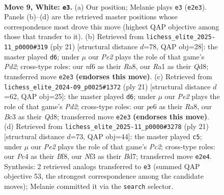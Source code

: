 \documentclass[11pt]{article}
\begin{document}
\clearpage

\begin{figure}[p]\centering
\begin{subfigure}{0.46\textwidth}\centering
\resizebox{\linewidth}{!}{%
\newchessgame
\chessboard[
  setfen={r1b1r1k1/ppppqppp/2n1pn2/8/2PP3P/2B2NP1/PP2PP2/R2QKB1R w KQ - 1 9},
  showmover=false,
  pgfstyle=straightmove, color=movearrow, markmove={e2-e3}
]}
\caption{}
\end{subfigure}\hfill
\begin{subfigure}{0.46\textwidth}\centering
\resizebox{\linewidth}{!}{%
\newchessgame
\chessboard[
  setfen={r1bq1rk1/2ppnpbp/p5p1/np6/3PP3/2N2N2/PPB2PPP/R1BQ1RK1 b - - 4 11},
  showmover=false,
  pgfstyle=straightmove, color=movearrow, markmove={d7-d6}
]}
\caption{}
\end{subfigure}
\\[4pt]
\begin{subfigure}{0.46\textwidth}\centering
\resizebox{\linewidth}{!}{%
\newchessgame
\chessboard[
  setfen={r1bq1rk1/pppp1pb1/2n3p1/4p2p/2P5/P1NPPN2/1P1QBPPP/R4RK1 b - - 7 11},
  showmover=false,
  pgfstyle=straightmove, color=movearrow, markmove={d7-d6}
]}
\caption{}
\end{subfigure}\hfill
\begin{subfigure}{0.46\textwidth}\centering
\resizebox{\linewidth}{!}{%
\newchessgame
\chessboard[
  setfen={r2qkb1r/2pb1ppp/p3pn2/1p6/3P4/P1N1PN2/1P2QPPP/R1B2RK1 b kq - 1 11},
  showmover=false,
  pgfstyle=straightmove, color=movearrow, markmove={c7-c5}
]}
\caption{}
\end{subfigure}
\caption{\textbf{Move 9, White: \texttt{e3}.} (a) Our position; Melanie plays \texttt{e3} (\texttt{e2e3}). Panels (b)--(d) are the retrieved master positions whose correspondence most drove this move (highest QAP objective among those that transfer to it). (b) Retrieved from \texttt{lichess\_elite\_2025-11\_p0000\#319} (ply 21) [structural distance $d$=78, QAP obj=28]: the master played \texttt{d6}; under $\mu$ our \emph{Pe2} plays the role of that game's \emph{Pd2}; cross-type roles: our \emph{n}f6 as their \emph{R}a8, our \emph{R}a1 as their \emph{Q}d8; transferred move \texttt{e2e3} \textbf{(endorses this move)}. (c) Retrieved from \texttt{lichess\_elite\_2024-09\_p0025\#1372} (ply 21) [structural distance $d$=62, QAP obj=25]: the master played \texttt{d6}; under $\mu$ our \emph{Pe2} plays the role of that game's \emph{Pd2}; cross-type roles: our \emph{p}e6 as their \emph{R}a8, our \emph{B}c3 as their \emph{Q}d8; transferred move \texttt{e2e3} \textbf{(endorses this move)}. (d) Retrieved from \texttt{lichess\_elite\_2025-11\_p0000\#3278} (ply 21) [structural distance $d$=73, QAP obj=44]: the master played \texttt{c5}; under $\mu$ our \emph{Pe2} plays the role of that game's \emph{Pc2}; cross-type roles: our \emph{P}c4 as their \emph{B}f8, our \emph{N}f3 as their \emph{B}d7; transferred move \texttt{e2e4}. Synthesis: 2 retrieved analogs transferred to \texttt{e3} (summed QAP objective 53, the strongest correspondence among the candidate moves); Melanie committed it via the \texttt{search} selector.}
\label{fig:thought-m16}
\end{figure}
\end{document}
